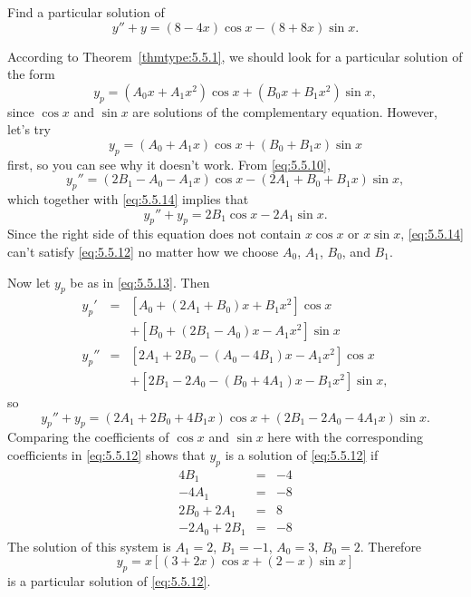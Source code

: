 \documentclass{ximera}
\begin{document}
\begin{example}\label{example:5.5.4}
Find a particular solution of
\begin{equation} \label{eq:5.5.12}
y''+y=(8-4x)\cos x-(8+8x)\sin x.
\end{equation}
 
\begin{explanation}
According to  Theorem~\ref{thmtype:5.5.1}, we should look for a
particular solution of the form
\begin{equation} \label{eq:5.5.13}
y_p=(A_0x+A_1x^2)\cos x+(B_0x+B_1x^2)\sin x,
\end{equation}
since $\cos x$ and $\sin x$ are solutions of the complementary
equation. However, let's  try
\begin{equation} \label{eq:5.5.14}
y_p=(A_0+A_1x)\cos x+(B_0+B_1x)\sin x
\end{equation}
first, so you can see why it doesn't work. From \eqref{eq:5.5.10},
$$
 y_p''=(2B_1-A_0-A_1x)\cos x-(2A_1+B_0+B_1x)\sin x,
$$
which together with \eqref{eq:5.5.14} implies that
$$
y_p''+y_p=2B_1\cos x-2A_1\sin x.
$$
Since the right side of this equation does not contain $x\cos x$
or $x\sin x$,  \eqref{eq:5.5.14} can't satisfy
\eqref{eq:5.5.12} no matter how we choose $A_0$, $A_1$, $B_0$, and $B_1$.
 
Now let $y_p$ be as in \eqref{eq:5.5.13}. Then
\begin{eqnarray*}
y_p'&=&\left[A_0+(2A_1+B_0)x+B_1x^2\right]\cos x\\ &&
+\left[B_0+(2B_1-A_0)x-A_1x^2\right]\sin x\\ 
y_p''&=&
\left[2A_1+2B_0-(A_0-4B_1)x-A_1x^2\right]\cos x\\ &&+
\left[2B_1-2A_0-(B_0+4A_1)x-B_1x^2\right]\sin x,
\end{eqnarray*}
so
$$
y_p''+y_p=(2A_1+2B_0+4B_1x)\cos x+(2B_1-2A_0-4A_1x)\sin x.
$$
Comparing the  coefficients of $\cos x$ and
$\sin x$ here  with the corresponding coefficients  in \eqref{eq:5.5.12}
shows that
$y_p$ is a solution of \eqref{eq:5.5.12} if
$$
\begin{array}{rcr}
4B_1&=&-4\\
-4A_1&=&-8\\
2B_0+2A_1&=&8\\
-2A_0+2B_1&=&-8
\end{array}
$$
The solution of this system is  $A_1=2$, $B_1=-1$, $A_0=3$, $B_0=2$.
  Therefore
$$
y_p=x\left[(3+2x)\cos x+(2-x)\sin x\right]
$$
is a particular solution of \eqref{eq:5.5.12}.
\end{explanation}
\end{example}
 
\end{document}
